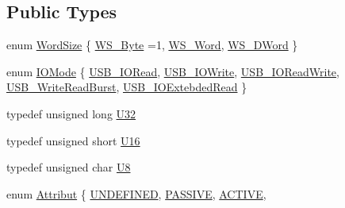 \subsection*{Public Types}
\begin{DoxyCompactItemize}
\item 
enum \hyperlink{classUsbFTMLInterface_ae0f25daa336091a5acd548aef3e9b4b4}{Word\+Size} \{ \hyperlink{classUsbFTMLInterface_ae0f25daa336091a5acd548aef3e9b4b4a6d1f2c03dd60649290649efd7fb7f57d}{W\+S\+\_\+\+Byte} =1, 
\hyperlink{classUsbFTMLInterface_ae0f25daa336091a5acd548aef3e9b4b4adcfe42e171e84db403d40614f2502f3e}{W\+S\+\_\+\+Word}, 
\hyperlink{classUsbFTMLInterface_ae0f25daa336091a5acd548aef3e9b4b4abff203c40a75d695acbf9190ae2dbe69}{W\+S\+\_\+\+D\+Word}
 \}
\item 
enum \hyperlink{classUsbFTMLInterface_a181227ebb27454964e5b6d185432498d}{I\+O\+Mode} \{ \newline
\hyperlink{classUsbFTMLInterface_a181227ebb27454964e5b6d185432498da71463bc1f4116a7456f7f298d030ecc7}{U\+S\+B\+\_\+\+I\+O\+Read}, 
\hyperlink{classUsbFTMLInterface_a181227ebb27454964e5b6d185432498daa9295e3a8e1c21709afd36f4405b346b}{U\+S\+B\+\_\+\+I\+O\+Write}, 
\hyperlink{classUsbFTMLInterface_a181227ebb27454964e5b6d185432498dae7dbd66b9634d787979e1b081defc297}{U\+S\+B\+\_\+\+I\+O\+Read\+Write}, 
\hyperlink{classUsbFTMLInterface_a181227ebb27454964e5b6d185432498da9c6732d74013c323f7d0346793ea105c}{U\+S\+B\+\_\+\+Write\+Read\+Burst}, 
\newline
\hyperlink{classUsbFTMLInterface_a181227ebb27454964e5b6d185432498dab677684fb0f754cbca04824b202d8ebe}{U\+S\+B\+\_\+\+I\+O\+Extebded\+Read}
 \}
\item 
typedef unsigned long \hyperlink{classUsbFTMLInterface_a142f8ce4b5873c295af8945f3894ae38}{U32}
\item 
typedef unsigned short \hyperlink{classUsbFTMLInterface_a5909beb462dc45c772d6f7ae79312ad7}{U16}
\item 
typedef unsigned char \hyperlink{classUsbFTMLInterface_af7c9f02ee6f59fefa68ef14f90dcbbd8}{U8}
\item 
enum \hyperlink{classAttrib_a69e171d7cc6417835a5a306d3c764235}{Attribut} \{ \newline
\hyperlink{classAttrib_a69e171d7cc6417835a5a306d3c764235a3a8da2ab97dda18aebab196fe4100531}{U\+N\+D\+E\+F\+I\+N\+ED}, 
\hyperlink{classAttrib_a69e171d7cc6417835a5a306d3c764235a2bfb2af57b87031d190a05fe25dd92ed}{P\+A\+S\+S\+I\+VE}, 
\hyperlink{classAttrib_a69e171d7cc6417835a5a306d3c764235a3b1fec929c0370d1436f2f06e298fb0d}{A\+C\+T\+I\+VE}, 

\end{DoxyCompactItemize}

